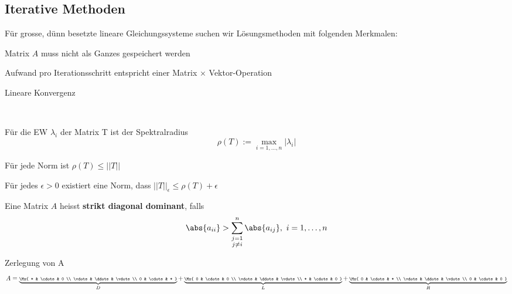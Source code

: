 	\subsection{Iterative Methoden}
		Für grosse, dünn besetzte lineare Gleichungssysteme suchen wir Lösungsmethoden mit folgenden Merkmalen:
		\begin{tightitemize}
			\item Matrix $A$ muss nicht als Ganzes gespeichert werden
			\item Aufwand pro Iterationsschritt entspricht einer Matrix $\times$ Vektor-Operation
			\item Lineare Konvergenz
		\end{tightitemize}
		
		~
		
		\begin{definition}
			Für die EW $\lambda_i$ der Matrix T ist der Spektralradius
			\[
				\rho(T) := \underset{i = 1, \dots , n}\max{|\lambda_i|}
			\]
			
			\begin{tightenumerate}
				\item Für jede Norm ist $\rho(T) \leq ||T||$ 
				\item Für jedes $\epsilon > 0$ existiert eine Norm, dass $||T||_\epsilon \leq \rho(T) + \epsilon$ 
			\end{tightenumerate}
		\end{definition}
		
		\begin{definition}
			Eine Matrix $A$ heisst \textbf{strikt diagonal dominant}, falls
			\[
				\abs{a_{ii}} > \sum_{\substack{
					j=1 \\ j \neq i
				}}^n \abs{a_{ij}}, \ i = 1,\dots,n
			\]
		\end{definition}
		
		\begin{notation}
			Zerlegung von A
			\[
				A = \scriptsize\underbrace{
					\Mx{
						* & \cdots & 0 \\
						\vdots & \ddots & \vdots \\
						0 & \cdots & *
					}
				}_{D} + \underbrace{
					\Mx{
						0 & \cdots & 0 \\
						\vdots & \ddots & \vdots \\
						* & \cdots & 0
					}
				}_{L} + \underbrace{
					\Mx{
						0 & \cdots & * \\
						\vdots & \ddots & \vdots \\
						0 & \cdots & 0
					}
				}_{R}
			\]
		\end{notation}

